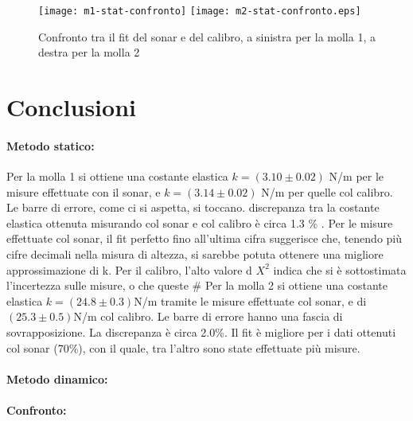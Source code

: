 \documentclass{article}
\begin{document}
\begin{figure}[h]
    \texttt{[image: m1-stat-confronto]}
    \texttt{[image: m2-stat-confronto.eps]}
    \caption{Confronto tra il fit del sonar e del calibro, a sinistra per la molla 1, a destra per la molla 2}
\end{figure}
\section{Conclusioni}

\paragraph{Metodo statico: }

Per la molla 1 si ottiene una costante elastica $k=(3.10 \pm 0.02)$ N/m per le misure effettuate con il sonar, e $ k= (3.14 \pm 0.02)$ N/m  per quelle col calibro. Le barre di errore, come ci si aspetta, si toccano.  discrepanza tra la costante elastica ottenuta misurando col sonar e col calibro è circa 1.3 \% . Per le misure effettuate col sonar, il fit perfetto fino all'ultima cifra suggerisce che, tenendo più cifre decimali nella misura di altezza, si sarebbe potuta ottenere una migliore approssimazione di k.
Per il calibro, l'alto valore d $X ^2 $ indica che si è sottostimata l'incertezza sulle misure, o che queste  #
\newline
 Per la molla 2 si ottiene una costante elastica $ k=(24.8 \pm 0.3)$N/m tramite le misure effettuate col sonar, e di $(25.3 \pm 0.5)$N/m col calibro. Le barre di errore hanno una fascia di sovrapposizione. La discrepanza è circa 2.0\%. Il fit è migliore per i dati ottenuti col sonar (70\%), con il quale, tra l'altro sono state effettuate più misure.

\paragraph{Metodo dinamico:}

\paragraph{Confronto:}
\end{document}
